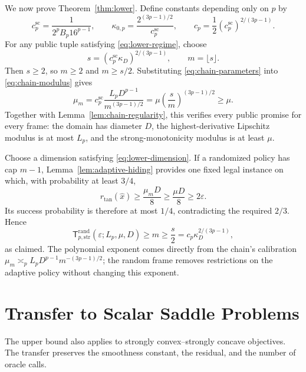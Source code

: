 \documentclass[11pt]{article}
\numberwithin{equation}{section}
\theoremstyle{definition}
\theoremstyle{remark}
\newcommand{\Trand}{\mathsf T_{p,\mathrm{str}}^{\mathrm{rand}}}
\begin{document}
We now prove Theorem~\ref{thm:lower}. Define constants depending only on
$p$ by
\begin{equation}\label{eq:lower-constants}
c_p^{\mathrm{sc}}=\frac1{2^pB_p16^{p-1}},\qquad
\kappa_{0,p}=\frac{2^{(3p-1)/2}}{c_p^{\mathrm{sc}}},\qquad
c_p=\frac12(c_p^{\mathrm{sc}})^{2/(3p-1)}.
\end{equation}
For any public tuple satisfying \eqref{eq:lower-regime}, choose
\begin{equation}\label{eq:chain-length}
s=(c_p^{\mathrm{sc}}\kappa_D)^{2/(3p-1)},
\qquad m=\lfloor s\rfloor.
\end{equation}
Then $s\ge2$, so $m\ge2$ and $m\ge s/2$. Substituting
\eqref{eq:chain-parameters} into \eqref{eq:chain-modulus} gives
\begin{equation}\label{eq:modulus-calibration}
\mu_m
=c_p^{\mathrm{sc}}\frac{L_pD^{p-1}}{m^{(3p-1)/2}}
=\mu\left(\frac{s}{m}\right)^{(3p-1)/2}
\ge\mu.
\end{equation}
Together with Lemma~\ref{lem:chain-regularity}, this verifies every
public promise for every frame: the domain has diameter $D$, the
highest-derivative Lipschitz modulus is at most $L_p$, and the
strong-monotonicity modulus is at least $\mu$.

Choose a dimension satisfying \eqref{eq:lower-dimension}. If a randomized policy
has cap $m-1$, Lemma~\ref{lem:adaptive-hiding} provides one fixed legal
instance on which, with probability at least $3/4$,
\begin{equation}\label{eq:fixed-instance-failure}
r_{\mathrm{tan}}(\widehat x)
\ge\frac{\mu_mD}{8}
\ge\frac{\mu D}{8}
\ge2\varepsilon.
\end{equation}
Its success probability is therefore at most $1/4$, contradicting the
required $2/3$. Hence
\[
\Trand(\varepsilon;L_p,\mu,D)
\ge m\ge\frac s2
=c_p\kappa_D^{2/(3p-1)},
\]
as claimed. The polynomial exponent comes directly from the chain's
calibration
$\mu_m\asymp_p L_pD^{p-1}m^{-(3p-1)/2}$; the random frame removes
restrictions on the adaptive policy without changing this exponent.


\section{Transfer to Scalar Saddle Problems}\label{sec:saddle}

The upper bound also applies to strongly convex--strongly concave
objectives. The transfer preserves the smoothness constant, the
residual, and the number of oracle calls.
\end{document}
